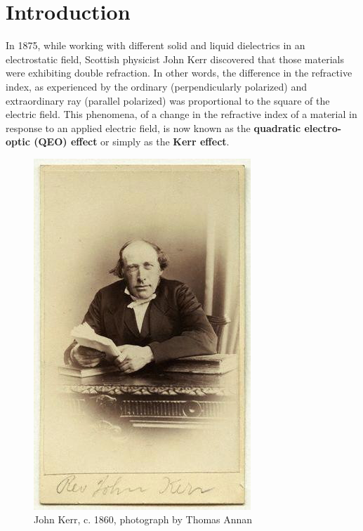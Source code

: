 \documentclass[%
 reprint,
 amsmath,amssymb,
 aps,
]{revtex4-2}
\begin{document}
\maketitle


\section{Introduction}
	In 1875, while working with different solid and liquid dielectrics in an electrostatic field, Scottish physicist John Kerr discovered that those materials were exhibiting double refraction. In other words, the difference in the refractive index, as experienced by the ordinary (perpendicularly polarized) and extraordinary ray (parallel polarized) was proportional to the square of the electric field. This phenomena, of a change in the refractive index of a material in response to an applied electric field, is now known as the \textbf{quadratic electro-optic (QEO) effect} or simply as the \textbf{Kerr effect}.
	\begin{figure}
		\centering
		\includegraphics[scale = 0.35]{kerr}
		\caption{John Kerr, c. 1860, photograph by Thomas Annan}
	\end{figure}
\end{document}
